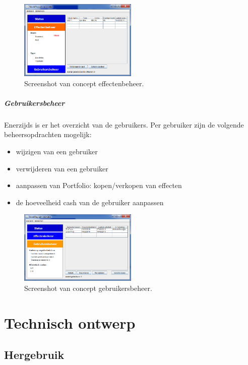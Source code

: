 \begin{figure}[h!]
	\centering
		\includegraphics[width=0.5\textwidth]{images/ontwerp/screenshot_app_effecten}
	\caption{Screenshot van concept effectenbeheer.}
\end{figure}

\paragraph{Gebruikersbeheer}Enerzijds is er het overzicht van de gebruikers. Per gebruiker zijn de volgende beheersopdrachten mogelijk: 
\begin{itemize}
	\item{wijzigen van een gebruiker}
	\item{verwijderen van een gebruiker}
	\item{aanpassen van Portfolio: kopen/verkopen van effecten}
	\item{de hoeveelheid cash van de gebruiker aanpassen}
\end{itemize}

\begin{figure}[h!]
	\centering
		\includegraphics[width=0.5\textwidth]{images/ontwerp/screenshot_app_gebruikers}
	\caption{Screenshot van concept gebruikersbeheer.}
\end{figure}


%
%

\chapter{Technisch ontwerp}

\section{Hergebruik}

